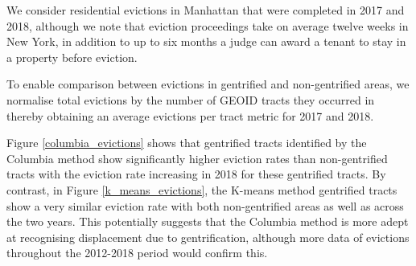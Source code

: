 We consider residential evictions in Manhattan that were completed in 2017 and 2018, although we note that eviction proceedings take on average twelve weeks in New York, in addition to up to six months a judge can award a tenant to stay in a property before eviction.

To enable comparison between evictions in gentrified and non-gentrified areas, we normalise total evictions by the number of GEOID tracts they occurred in thereby obtaining an average evictions per tract metric for 2017 and 2018. 

Figure \ref{columbia_evictions} shows that gentrified tracts identified by the Columbia method show significantly higher eviction rates than non-gentrified tracts with the eviction rate increasing in 2018 for these gentrified tracts. By contrast, in Figure \ref{k_means_evictions}, the K-means method gentrified tracts show a very similar eviction rate with both non-gentrified areas as well as across the two years. This potentially suggests that the Columbia method is more adept at recognising displacement due to gentrification, although more data of evictions throughout the 2012-2018 period would confirm this. 

